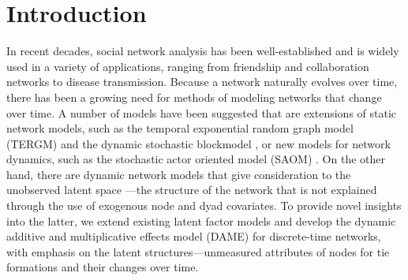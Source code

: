 \documentclass[a4paper]{article}
\begin{document}
	\section{Introduction} \label{sec: Introduction}
	In recent decades, social network analysis has been well-established and is widely used in a variety of applications, ranging from friendship and collaboration networks to disease transmission.  Because a network naturally evolves over time, there has been a growing need for methods of modeling networks that change over time. A number of models have been suggested that are extensions of static network models, such as the temporal exponential random graph model (TERGM) \citep{hanneke2010discrete} and the dynamic stochastic blockmodel \citep{xu2013dynamic}, or new models for network dynamics, such as the stochastic actor oriented model (SAOM) \citep{snijders2010introduction}. On the other hand, there are dynamic network models that give consideration to the unobserved latent space \citep{hoff2002latent}---the structure of the network that is not explained through the use of exogenous node and dyad covariates. To provide novel insights into the latter, we extend existing latent factor models \citep{hoff2005bilinear,hoff2009multiplicative,hoff2014amen,minhas2016inferential} and develop the dynamic additive and multiplicative effects model (DAME) for discrete-time networks, with emphasis on the latent structures---unmeasured attributes of nodes for tie formations and their changes over time.\\ \newline
\end{document}
